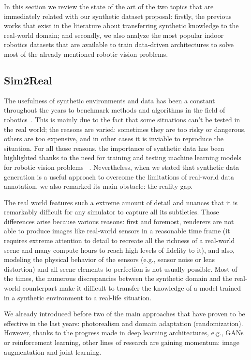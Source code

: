 In this section we review the state of the art of the two topics that are immediately related with our synthetic dataset proposal: firstly, the previous works that exist in the literature about transferring synthetic knowledge to the real-world domain; and secondly, we also analyze the most popular indoor robotics datasets that are available to train data-driven architectures to solve most of the already mentioned robotic vision problems.

\subsection{Sim2Real}

The usefulness of synthetic environments and data has been a constant throughout the years to benchmark methods and algorithms in the field of robotics~\cite{Butler2012}. This is mainly due to the fact that some situations can't be tested in the real world; the reasons are varied: sometimes they are too risky or dangerous, others are too expensive, and in other cases it is inviable to reproduce the situation. For all those reasons, the importance of synthetic data has been highlighted thanks to the need for training and testing machine learning models for robotic vision problems~ \cite{Brodeur2017} \cite{Ros2016} \cite{Mahler2017dex}. Nevertheless, when we stated that synthetic data generation is a useful approach to overcome the limitations of real-world data annotation, we also remarked its main obstacle: the reality gap.

The real world features such a extreme amount of detail and nuances that it is remarkably difficult for any simulator to capture all its subtleties. Those differences arise because various reasons: first and foremost, renderers are not able to produce images like real-world sensors in a reasonable time frame (it requires extreme attention to detail to recreate all the richness of a real-world scene and many compute hours to reach high levels of fidelity to it), and also, modeling the physical behavior of the sensors (e.g., sensor noise or lens distortion) and all scene elements to perfection is not usually possible. Most of the times, the numerous discrepancies between the synthetic domain and the real-world counterpart make it difficult to transfer the knowledge of a model trained in a synthetic environment to a real-life situation.

We already introduced before two of the main approaches that have proven to be effective in the last years: photorealism and domain adaptation (randomization). However, thanks to the progress made in deep learning architectures, e.g., \acp{GAN} or reinforcement learning, other lines of research are gaining momentum: image augmentation and joint learning.

